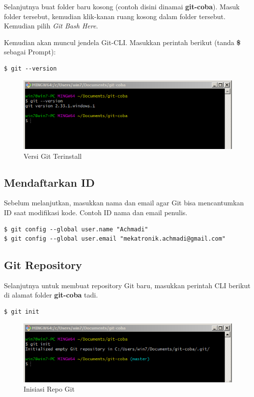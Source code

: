 \documentclass[12pt]{book}
\begin{document}
	Selanjutnya buat folder baru kosong (contoh disini dinamai \textbf{git-coba}).
	Masuk folder tersebut, kemudian klik-kanan ruang kosong dalam folder tersebut.
	Kemudian pilih \textit{Git Bash Here}. 
	
	\newpage
	Kemudian akan muncul jendela Git-CLI.
	Masukkan perintah berikut (tanda \textbf{\$} sebagai Prompt):
	\begin{verbatim}
$ git --version
	\end{verbatim}
	
	\begin{figure}[!ht]
		\centering
		\includegraphics[width=400pt]{images/git0}
		\caption{Versi Git Terinstall}
	\end{figure}
	 
	\subsection{Mendaftarkan ID}
	
	Sebelum melanjutkan, masukkan nama dan email agar Git bisa mencantumkan ID saat modifikasi kode.
	Contoh ID nama dan email penulis.
	\begin{verbatim}
$ git config --global user.name "Achmadi"
$ git config --global user.email "mekatronik.achmadi@gmail.com"
	\end{verbatim}

	\subsection{Git Repository}
	
	Selanjutnya untuk membuat repository Git baru, masukkan perintah CLI berikut di alamat folder \textbf{git-coba} tadi.
	\begin{verbatim}
$ git init
	\end{verbatim}

	\begin{figure}[!ht]
		\centering
		\includegraphics[width=400pt]{images/git1}
		\caption{Inisiasi Repo Git}
	\end{figure}
\end{document}
